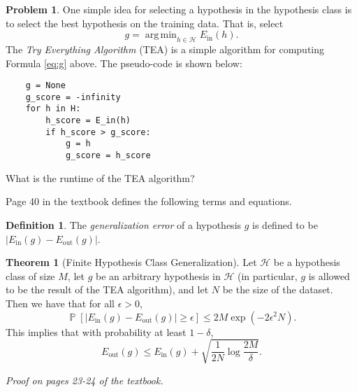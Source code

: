 \documentclass[10pt]{exam}
\theoremstyle{definition}
\newtheorem{problem}{Problem}
\newtheorem{defn}{Definition}
\newtheorem{theorem}{Theorem}
\DeclareMathOperator{\prob}{\mathbb P}
\DeclareMathOperator*{\argmin}{arg\,min}
\newcommand{\Ein}{E_{\text{in}}}
\newcommand{\Eout}{E_{\text{out}}}
\begin{document}
\newpage
\begin{problem}
    One simple idea for selecting a hypothesis in the hypothesis class is to select the best hypothesis on the training data.
    That is, select
    \begin{equation}
        \label{eq:g}
        g = \argmin_{h\in\mathcal H} \Ein(h)
        .
    \end{equation}
    The \emph{Try Everything Algorithm} (TEA) is a simple algorithm for computing Formula \ref{eq:g} above.
    The pseudo-code is shown below:
    \begin{lstlisting}
    g = None
    g_score = -infinity
    for h in H:
        h_score = E_in(h)
        if h_score > g_score:
            g = h
            g_score = h_score
    \end{lstlisting}
    What is the runtime of the TEA algorithm?
\end{problem}

\newpage
\noindent
Page 40 in the textbook defines the following terms and equations.

\begin{defn}
    The \emph{generalization error} of a hypothesis $g$ is defined to be
    $|\Ein(g) - \Eout(g)|$.
\end{defn}

\begin{theorem}[Finite Hypothesis Class Generalization]
    Let $\mathcal H$ be a hypothesis class of size $M$,
    let $g$ be an arbitrary hypothesis in $\mathcal H$
    (in particular, $g$ is allowed to be the result of the TEA algorithm),
    and let $N$ be the size of the dataset.
    Then we have that for all $\epsilon>0$,
    \begin{equation*}
    \prob[|\Ein(g) - \Eout(g)| \ge \epsilon] \le 2M\exp(-2\epsilon^2 N).
    \end{equation*}
    This implies that with probability at least $1-\delta$,
    \begin{equation*}
        \Eout(g) \le \Ein(g) + \sqrt{\frac{1}{2N} \log\frac{2M}{\delta}}.
    \end{equation*}
\end{theorem}
\noindent
    \emph{Proof on pages 23-24 of the textbook.}
\end{document}
